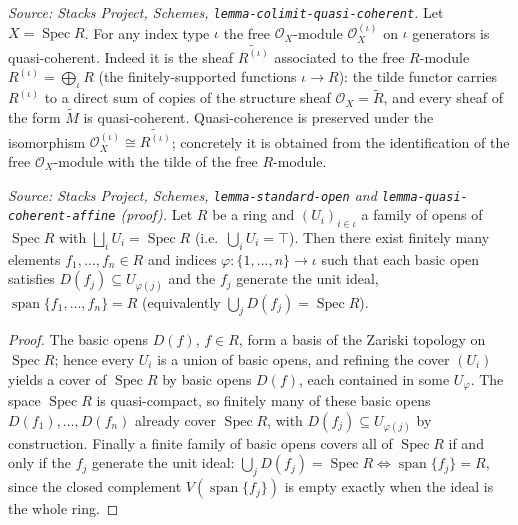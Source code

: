 \begin{lemma}\label{mk-lem:free_isQuasicoherent}
  \leanok

  \textit{Source: Stacks Project, Schemes, \texttt{lemma-colimit-quasi-coherent}.}
  Let \(X = \operatorname{Spec} R\). For any index type \(\iota\) the free
  \(\mathcal{O}_X\)-module \(\mathcal{O}_X^{(\iota)}\) on \(\iota\) generators is
  quasi-coherent. Indeed it is the sheaf \(\widetilde{R^{(\iota)}}\) associated to the
  free \(R\)-module \(R^{(\iota)} = \bigoplus_{\iota} R\) (the finitely-supported
  functions \(\iota \to R\)): the tilde functor carries \(R^{(\iota)}\) to a direct sum
  of copies of the structure sheaf \(\mathcal{O}_X = \widetilde{R}\), and every sheaf of
  the form \(\widetilde{M}\) is quasi-coherent. Quasi-coherence is preserved under the
  isomorphism \(\mathcal{O}_X^{(\iota)} \cong \widetilde{R^{(\iota)}}\); concretely it is
  obtained from the identification of the free \(\mathcal{O}_X\)-module with the
  tilde of the free \(R\)-module.
\end{lemma}

\begin{lemma}\label{mk-lem:exists_finite_basicOpen_subcover}
  \leanok

  \textit{Source: Stacks Project, Schemes, \texttt{lemma-standard-open} and
  \texttt{lemma-quasi-coherent-affine} (proof).}
  Let \(R\) be a ring and \((U_i)_{i \in \iota}\) a family of opens of
  \(\operatorname{Spec} R\) with \(\bigsqcup_i U_i = \operatorname{Spec} R\) (i.e.\
  \(\bigcup_i U_i = \top\)). Then there exist finitely many elements
  \(f_1, \ldots, f_n \in R\) and indices \(\varphi : \{1, \ldots, n\} \to \iota\) such
  that each basic open satisfies \(D(f_j) \subseteq U_{\varphi(j)}\) and the \(f_j\)
  generate the unit ideal, \(\operatorname{span}\{f_1, \ldots, f_n\} = R\) (equivalently
  \(\bigcup_j D(f_j) = \operatorname{Spec} R\)).
\end{lemma}
\begin{proof}
  \leanok

The basic opens \(D(f)\), \(f \in R\), form a basis of the Zariski topology on
  \(\operatorname{Spec} R\); hence every \(U_i\) is a union of basic opens, and refining
  the cover \((U_i)\) yields a cover of \(\operatorname{Spec} R\) by basic opens
  \(D(f)\), each contained in some \(U_{\varphi}\). The space \(\operatorname{Spec} R\)
  is quasi-compact, so finitely many of these basic opens \(D(f_1), \ldots, D(f_n)\)
  already cover \(\operatorname{Spec} R\), with \(D(f_j) \subseteq U_{\varphi(j)}\) by
  construction. Finally a finite family of basic opens covers all of
  \(\operatorname{Spec} R\) if and only if the \(f_j\) generate the unit ideal:
  \(\bigcup_j D(f_j) = \operatorname{Spec} R \iff \operatorname{span}\{f_j\} = R\), since
  the closed complement \(V(\operatorname{span}\{f_j\})\) is empty exactly when the ideal
  is the whole ring.
\end{proof}

